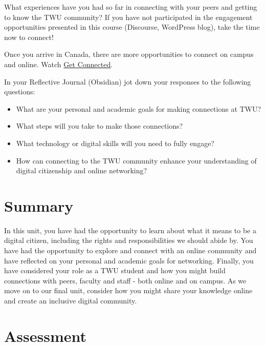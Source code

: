 \documentclass[
]{book}
\providecommand{\tightlist}{%
  \setlength{\itemsep}{0pt}\setlength{\parskip}{0pt}}
\theoremstyle{definition}
\theoremstyle{definition}
\theoremstyle{definition}
\theoremstyle{definition}
\theoremstyle{remark}
\begin{document}
\begin{reflect}
What experiences have you had so far in connecting with your peers and getting to know the TWU community? If you have not participated in the engagement opportunities presented in this course (Discourse, WordPress blog), take the time now to connect!

Once you arrive in Canada, there are more opportunities to connect on campus and online. Watch \href{https://vimeo.com/584977176/f1938444cb}{Get Connected}.

In your Reflective Journal (Obsidian) jot down your responses to the following questions:

\begin{itemize}
\tightlist
\item
  What are your personal and academic goals for making connections at TWU?\\
\item
  What steps will you take to make those connections?\\
\item
  What technology or digital skills will you need to fully engage?
\item
  How can connecting to the TWU community enhance your understanding of digital citizenship and online networking?
\end{itemize}
\end{reflect}

\hypertarget{summary-4}{%
\section*{Summary}\label{summary-4}}

In this unit, you have had the opportunity to learn about what it means to be a digital citizen, including the rights and responsibilities we should abide by. You have had the opportunity to explore and connect with an online community and have reflected on your personal and academic goals for networking. Finally, you have considered your role as a TWU student and how you might build connections with peers, faculty and staff - both online and on campus. As we move on to our final unit, consider how you might share your knowledge online and create an inclusive digital community.

\hypertarget{assessment-4}{%
\section*{Assessment}\label{assessment-4}}
\end{document}
